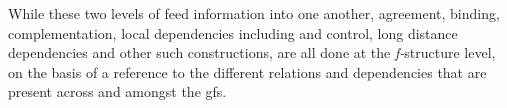 \documentclass[output=paper]{LSP/langsci}
\begin{document}
While these two levels of  feed information into one another, agreement, binding, complementation, local dependencies including  and control, long distance dependencies and other such constructions, are all done at the \emph{f-}structure level, on the basis of a reference to the different relations and dependencies that are present across and amongst the {\sc gf}s. 
\end{document}
